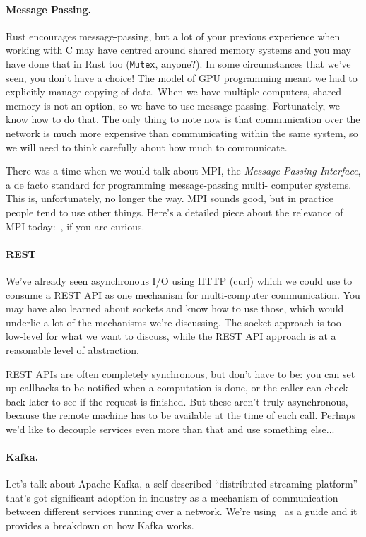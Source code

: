 \documentclass[a4paper]{report}
\begin{document}
\paragraph*{Message Passing.} Rust encourages message-passing, but
a lot of your previous experience when working with C may have centred around
shared memory systems and you may have done that in Rust too (\texttt{Mutex}, 
anyone?). In some circumstances that we've seen, you don't have a choice!
The model of GPU programming meant we had to explicitly
manage copying of data. When we have multiple computers, shared memory is not
an option, so we have to use message passing. Fortunately, we know how to do
that. The only thing to note now is that communication over the network is
much more expensive than communicating within the same system, so we will
need to think carefully about how much to communicate.

There was a time when we would talk about MPI, the \emph{Message Passing 
Interface}, a de facto standard for programming message-passing multi-
computer systems. This is, unfortunately, no longer the way. 
MPI sounds good, but in practice people tend to use other things. 
Here's a detailed piece about the relevance of MPI today:~\cite{hpcmpi}, if 
you are curious. 

\paragraph{REST}
We've already seen asynchronous I/O using HTTP (curl) which we could use to
consume a REST API as one mechanism for multi-computer communication. You
may have also learned about sockets and know how to use those, which would
underlie a lot of the mechanisms we're discussing. The socket approach is too
low-level for what we want to discuss, while the REST API approach is at a
reasonable level of abstraction. 

REST APIs are often completely synchronous, but don't have to be: 
you can set up  callbacks to be notified when a computation is done, or
the caller can check back later to see if the request is finished. But these
aren't truly asynchronous, because the remote machine has to be available at
the time of each call. Perhaps we'd like to decouple services even more than
that and use something else...

\paragraph{Kafka.} 
Let's talk about Apache Kafka, a self-described ``distributed streaming platform'' that's got significant adoption in industry as a mechanism of communication between different services running over a network. We're using~\cite{kafka} as a guide and it provides a breakdown on how Kafka works.
\end{document}
